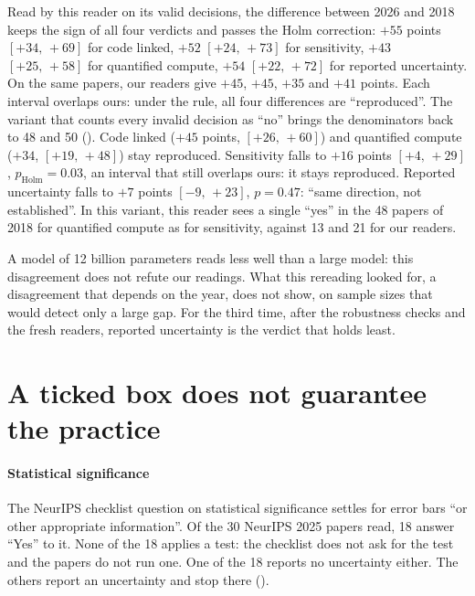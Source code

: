 Read by this reader on its valid decisions, the difference between 2026 and 2018 keeps the sign of all
four verdicts and passes the Holm correction: $+55$ points $[+34,\,+69]$ for code linked, $+52$
$[+24,\,+73]$ for sensitivity, $+43$ $[+25,\,+58]$ for quantified compute, $+54$ $[+22,\,+72]$ for
reported uncertainty. On the same papers, our readers give $+45$, $+45$, $+35$ and $+41$ points. Each
interval overlaps ours: under the rule, all four differences are
\enquote{reproduced}. The variant that counts every invalid decision as \enquote{no}
brings the denominators back to 48 and 50 (). Code linked
($+45$ points, $[+26,\,+60]$) and quantified compute ($+34$, $[+19,\,+48]$) stay reproduced.
Sensitivity falls to $+16$ points $[+4,\,+29]$, $p_{\text{Holm}} = 0.03$, an interval that still
overlaps ours: it stays reproduced. Reported uncertainty falls to $+7$ points $[-9,\,+23]$, $p = 0.47$:
\enquote{same direction, not established}. In this variant, this reader sees a single \enquote{yes} in
the 48 papers of 2018 for quantified compute as for sensitivity, against 13 and 21 for our readers.

A model of 12 billion parameters reads less well than a large model: this
disagreement does not refute our readings. What this rereading looked for, a disagreement that depends
on the year, does not show, on sample sizes that would detect only a large gap. For the third time,
after the robustness checks and the fresh readers, reported uncertainty is the verdict that holds
least.

\section{A ticked box does not guarantee the practice}\label{sec:sr-declarations}

\paragraph{Statistical significance}
The NeurIPS checklist question on statistical significance settles for error bars \enquote{or other
appropriate information}. Of the 30 NeurIPS 2025 papers read, 18 answer \enquote{Yes} to it. None of
the 18 applies a test: the checklist does not ask for the test and the papers do not run one. One of
the 18 reports no uncertainty either. The others report an uncertainty and stop there
().

